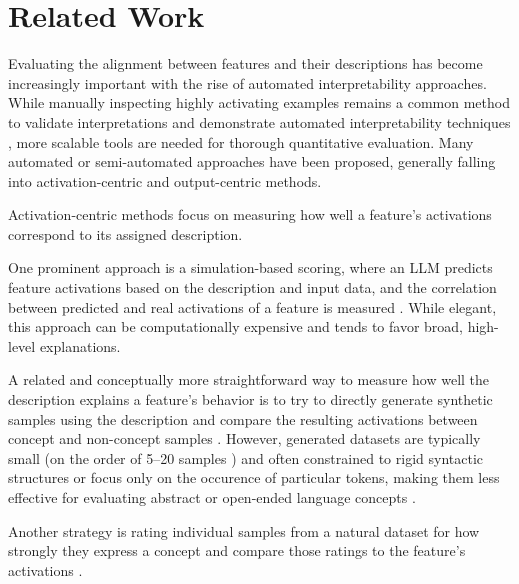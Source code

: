 \section{Related Work}


Evaluating the alignment between features and their descriptions has become increasingly important with the rise of automated interpretability approaches. While manually inspecting highly activating examples remains a common method to validate interpretations and demonstrate automated interpretability techniques \cite{bills2023language, templeton2024scaling}, more scalable tools are needed for thorough quantitative evaluation. Many automated or semi-automated approaches have been proposed, generally falling into activation-centric and output-centric methods.

Activation-centric methods focus on measuring how well a feature’s activations correspond to its assigned description.

One prominent approach is a simulation-based scoring, where an LLM predicts feature activations based on the description and input data, and the correlation between predicted and real activations of a feature is measured \cite{bills2023language, bricken2023monosemanticity, choi2024automatic}. While elegant, this approach can be computationally expensive and tends to favor broad, high-level explanations.

A related and conceptually more straightforward way to measure how well the description explains a feature's behavior is to try to directly generate synthetic samples using the description and compare the resulting activations between concept and non-concept samples \cite{huang-etal-2023-rigorously, DBLP:conf/nips/KopfBHLHB24, gurarieh2025enhancingautomatedinterpretabilityoutputcentric, shaham2025multimodalautomatedinterpretabilityagent}. However, generated datasets are typically small (on the order of 5–20 samples \cite{huang-etal-2023-rigorously, gurarieh2025enhancingautomatedinterpretabilityoutputcentric}) and often constrained to rigid syntactic structures or focus only on the occurence of particular tokens, making them less effective for evaluating abstract or open-ended language concepts \cite{huang-etal-2023-rigorously, foote2023n2gscalableapproachquantifying}.

Another strategy is rating individual samples from a natural dataset for how strongly they express a concept and compare those ratings to the feature's activations \cite{huang-etal-2023-rigorously, paulo2024automaticallyinterpretingmillionsfeatures, templeton2024scaling}. 

